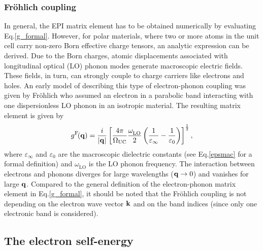 \subsubsection{Fr\"ohlich coupling}\label{subsec_frohlich}

In general, the EPI matrix element has to be obtained numerically by evaluating Eq.\;\eqref{g_formal}. However,  for polar materials, where two or more atoms in the unit cell carry non-zero Born effective charge tensors, an analytic expression can be derived. Due to the Born charges,  atomic displacements associated with longitudinal optical (LO) phonon modes generate macroscopic electric fields. These fields, in turn, can strongly couple to charge carriers like electrons and holes. An early model of describing this type of electron-phonon coupling was given by Fr\"ohlich\cite{froehlich} who assumed an electron in a parabolic band interacting with one dispersionless LO phonon in an isotropic material. The resulting matrix element is given by 
        \begin{equation}
        g^\text{F\!}(\mathbf{q}) = \frac{i}{|\mathbf{q}|}\left[\frac{4\pi}{\Omega_\text{UC}}\frac{\omega^{\phantom{I}}_\text{LO}}{2}\left(\frac{1}{\varepsilon_\infty} - \frac{1}{\varepsilon_0}\right)\right]^\frac{1}{2},
        \end{equation}
%       
where $\varepsilon_\infty$ and $\varepsilon_0$ are the macroscopic dielectric constants (see Eq.\;\eqref{epsmac} for a formal definition) and $\omega^{\phantom{I}}_\text{LO}$  is the LO phonon frequency. The interaction between electrons and phonons diverges for large wavelengths ($\mathbf{q}\rightarrow0$) and vanishes for large $\mathbf{q}$. Compared to the general definition of the electron-phonon matrix element in Eq.\;\eqref{g_formal}, it should be noted that the Fr\"ohlich coupling is not depending on the electron wave vector $\mathbf{k}$ and on the band indices (since only one electronic band is considered).
\subsection{The electron self-energy}

%
